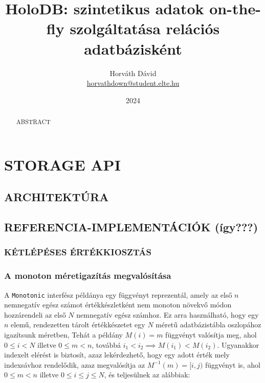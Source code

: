 \documentclass[
    parspace,
    noindent,
    nohyp,
]{elteiktdk}[2023/04/10]
\title{HoloDB: szintetikus adatok on-the-fly szolgáltatása relációs adatbázisként}
\date{2024}
\author{Horváth Dávid \\ {\small\href{mailto:horvathdown@student.elte.hu}{horvathdown@student.elte.hu}} }
\affiliation{Mesteroktató}
\begin{document}

\listoftodos
\cleardoublepage

\makecover
\cleardoublepage

\maketitle

\tableofcontents
\cleardoublepage


\begin{abstract}
ABSTRACT
\end{abstract}



\chapter{STORAGE API}

\section{ARCHITEKTÚRA}

\section{REFERENCIA-IMPLEMENTÁCIÓK (így???)}

\subsection{KÉTLÉPÉSES ÉRTÉKKIOSZTÁS}

\subsection{A monoton méretigazítás megvalósítása}

A \texttt{Monotonic} interfész példánya egy függvényt reprezentál,
amely az első $n$ nemnegatív egész számot értékkészletként nem monoton növekvő módon hozzárendeli az első $N$ nemnegatív egész számhoz.
Ez arra használható, hogy egy $n$ elemű, rendezetten tárolt értékkészetet egy $N$ méretű adatbázistábla oszlopához igazítsunk méretben,
Tehát a példány $M(i) = m$ függvényt valósítja meg, ahol $0 \leq i < N$ illetve $0 \leq m < n$, továbbá $i_1 < i_2 \implies M(i_1) < M(i_2)$.
Ugyanakkor indexelt elérést is biztosít, azaz lekérdezhető, hogy egy adott érték mely indexsávhoz rendelődik,
azaz megvalósítja az $M^{-1}(m) = [i, j)$ függvényt is, ahol $0 \leq m < n$ illetve $0 \leq i \leq j \leq N$, és teljesülnek az alábbiak:
\end{document}
